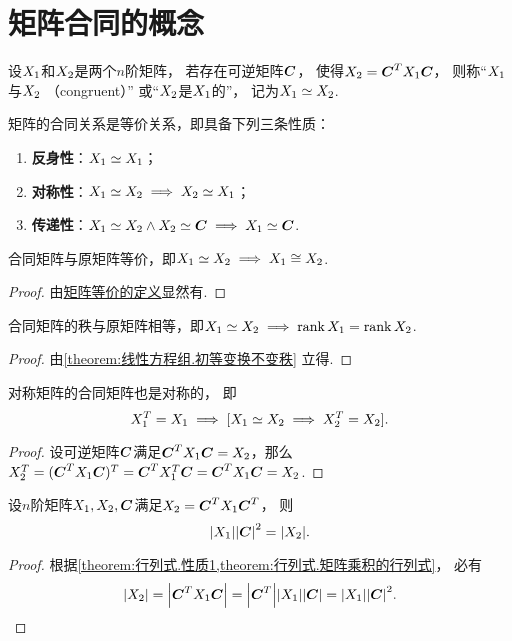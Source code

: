 \section{矩阵合同的概念}
\begin{definition}
设\(X_1\)和\(X_2\)是两个\(n\)阶矩阵，
若存在可逆矩阵\(\boldsymbol{C}\)，
使得\(X_2=\boldsymbol{C}^TX_1\boldsymbol{C}\)，
则称“\(X_1\)与\(X_2\) （congruent）”
或“\(X_2\)是\(X_1\)的”，
记为\(X_1\simeq X_2\).
\end{definition}

\begin{property}
矩阵的合同关系是等价关系，即具备下列三条性质：
\begin{enumerate}
	\item {\bf 反身性}：\(X_1\simeq X_1\)；
	\item {\bf 对称性}：\(X_1\simeq X_2 \implies X_2\simeq X_1\)；
	\item {\bf 传递性}：\(X_1\simeq X_2 \land X_2\simeq\boldsymbol{C} \implies X_1\simeq\boldsymbol{C}\).
\end{enumerate}
\end{property}

\begin{property}
合同矩阵与原矩阵等价，即\(X_1\simeq X_2 \implies X_1\cong X_2\).
\begin{proof}
由\hyperref[definition:逆矩阵.矩阵等价]{矩阵等价的定义}显然有.
\end{proof}
\end{property}

\begin{property}
合同矩阵的秩与原矩阵相等，即\(X_1\simeq X_2 \implies \rank X_1=\rank X_2\).
\begin{proof}
由\cref{theorem:线性方程组.初等变换不变秩} 立得.
\end{proof}
\end{property}

\begin{property}
对称矩阵的合同矩阵也是对称的，
即\[
	X_1^T = X_1
	\implies
	[X_1\simeq X_2 \implies X_2^T = X_2].
\]
\begin{proof}
设可逆矩阵\(\boldsymbol{C}\)满足\(\boldsymbol{C}^TX_1\boldsymbol{C}=X_2\)，那么%
\(X_2^T = (\boldsymbol{C}^TX_1\boldsymbol{C})^T = \boldsymbol{C}^TX_1^T\boldsymbol{C} = \boldsymbol{C}^TX_1\boldsymbol{C} = X_2\).
\end{proof}
\end{property}

\begin{proposition}\label{theorem:矩阵合同.合同矩阵的行列式的关系}
设\(n\)阶矩阵\(X_1,X_2,\boldsymbol{C}\)满足\(X_2=\boldsymbol{C}^TX_1\boldsymbol{C}^T\)，
则\[
	\abs{X_1}\abs{\boldsymbol{C}}^2
	=\abs{X_2}.
\]
\begin{proof}
根据\cref{theorem:行列式.性质1,theorem:行列式.矩阵乘积的行列式}，
必有\[
	\abs{X_2}
	=\abs{\boldsymbol{C}^TX_1\boldsymbol{C}}
	=\abs{\boldsymbol{C}^T}\abs{X_1}\abs{\boldsymbol{C}}
	=\abs{X_1}\abs{\boldsymbol{C}}^2.
	\qedhere
\]
\end{proof}
\end{proposition}

